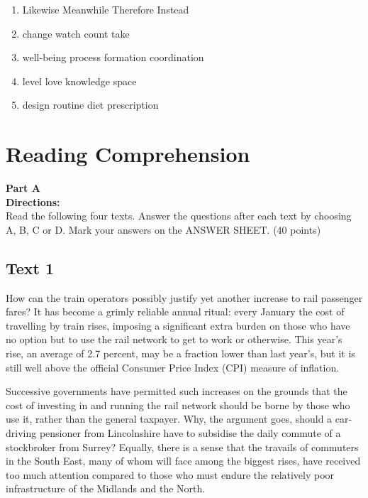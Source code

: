 \begin{enumerate}
	
\item 
\fourchoices
{Likewise}
{Meanwhile}
{Therefore}
{Instead}

	
\item 
\fourchoices
{change}
{watch}
{count}
{take}

	
\item 
\fourchoices
{well-being}
{process}
{formation}
{coordination}

	
\item 
\fourchoices
{level}
{love}
{knowledge}
{space}

\item 
\fourchoices
{design}
{routine}
{diet}
{prescription}


\end{enumerate}


\vfil

\section{Reading Comprehension}



\noindent
\textbf{Part A}\\
\textbf{Directions:}\\
Read the following four texts. Answer the questions after each
text by choosing A, B, C or
D. Mark your answers
on the ANSWER SHEET. (40 points)


\newpage
\subsection{Text 1}



How can the train operators possibly justify yet another increase to
rail passenger fares? It has become a grimly reliable annual ritual:
every January the cost of travelling by train rises, imposing a
significant extra burden on those who have no option but to use the rail
network to get to work or otherwise. This year's rise, an average of 2.7
percent, may be a fraction lower than last year's, but it is still well
above the official Consumer Price Index (CPI) measure of inflation.

Successive governments have permitted such increases on the grounds that
the cost of investing in and running the rail network should be borne by
those who use it, rather than the general taxpayer. Why, the argument
goes, should a car-driving pensioner from Lincolnshire have to subsidise
the daily commute of a stockbroker from Surrey? Equally, there is a
sense that the travails of commuters in the South East, many of whom
will face among the biggest rises, have received too much attention
compared to those who must endure the relatively poor infrastructure of
the Midlands and the North.

